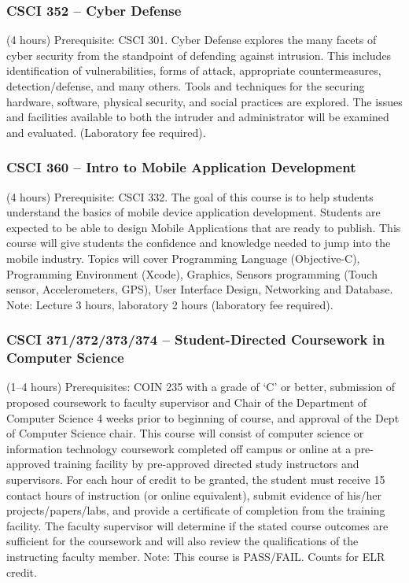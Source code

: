 \subsubsection{CSCI 352 -- Cyber Defense}
(4 hours) Prerequisite: CSCI 301. Cyber Defense explores the many facets of cyber security from the standpoint of defending against intrusion.  This includes identification of vulnerabilities, forms of attack, appropriate countermeasures, detection/defense, and many others.  Tools and techniques for the securing hardware, software, physical security, and social practices are explored.   The issues and facilities available to both the intruder and administrator will be examined and evaluated. (Laboratory fee required).

\subsubsection{CSCI 360 -- Intro to Mobile Application Development}
(4 hours) Prerequisite: CSCI 332. The goal of this course is to help students understand the basics of mobile device application development. Students are expected to be able to design Mobile Applications that are ready to publish. This course will give students the confidence and knowledge needed to jump into the mobile industry. Topics will cover Programming Language (Objective-C), Programming Environment (Xcode), Graphics, Sensors programming (Touch sensor, Accelerometers, GPS), User Interface Design, Networking and Database. Note: Lecture 3 hours, laboratory 2 hours (laboratory fee required).

\subsubsection{CSCI 371/372/373/374 -- Student-Directed Coursework in Computer Science}
(1--4 hours) Prerequisites: COIN 235 with a grade of ‘C’ or better, submission of proposed coursework to faculty supervisor and Chair of the Department of Computer Science 4 weeks prior to beginning of course, and approval of the Dept of Computer Science chair. This course will consist of computer science or information technology coursework completed off campus or online at a pre-approved training facility by pre-approved directed study instructors and supervisors. For each hour of credit to be granted, the student must receive 15 contact hours of instruction (or online equivalent), submit evidence of his/her projects/papers/labs, and provide a certificate of completion from the training facility. The faculty supervisor will determine if the stated course outcomes are sufficient for the coursework and will also review the qualifications of the instructing faculty member.  Note: This course is PASS/FAIL. Counts for ELR credit.

